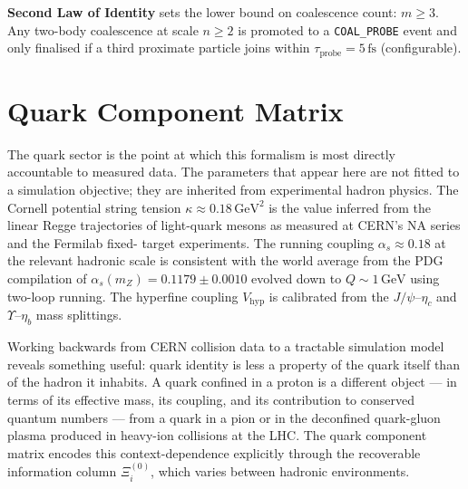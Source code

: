 \documentclass[11pt,a4paper]{article}
\newcommand{\Rec}{\Xi}
\newcommand{\fs}{\,\mathrm{fs}}
\begin{document}
\begin{smlaw}
\textbf{Second Law of Identity} sets the lower bound on coalescence count:
$m \geq 3$.  Any two-body coalescence at scale $n \geq 2$ is promoted to a
\texttt{COAL\_PROBE} event and only finalised if a third proximate particle
joins within $\tau_{\mathrm{probe}} = 5\fs$ (configurable).
\end{smlaw}


\section{Quark Component Matrix}\label{sec:quark}

The quark sector is the point at which this formalism is most directly
accountable to measured data.  The parameters that appear here are not
fitted to a simulation objective; they are inherited from experimental
hadron physics.  The Cornell potential string tension $\kappa \approx
0.18\,\mathrm{GeV}^2$ is the value inferred from the linear Regge trajectories
of light-quark mesons as measured at CERN's NA series and the Fermilab fixed-
target experiments.  The running coupling $\alpha_s \approx 0.18$ at the
relevant hadronic scale is consistent with the world average from the PDG
compilation of $\alpha_s(m_Z) = 0.1179 \pm 0.0010$ evolved down to
$Q \sim 1\,\mathrm{GeV}$ using two-loop running.  The hyperfine coupling
$V_{\mathrm{hyp}}$ is calibrated from the $J/\psi$--$\eta_c$ and
$\Upsilon$--$\eta_b$ mass splittings.

Working backwards from CERN collision data to a tractable simulation model
reveals something useful: quark identity is less a property of the quark
itself than of the hadron it inhabits.  A quark confined in a proton is
a different object --- in terms of its effective mass, its coupling, and its
contribution to conserved quantum numbers --- from a quark in a pion or in
the deconfined quark-gluon plasma produced in heavy-ion collisions at the LHC.
The quark component matrix encodes this context-dependence explicitly through
the recoverable information column $\Rec_i^{(0)}$, which varies between
hadronic environments.
\end{document}
